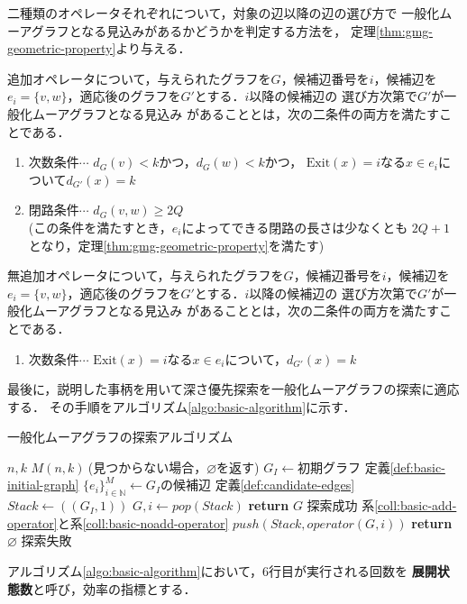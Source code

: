 二種類のオペレータそれぞれについて，対象の辺以降の辺の選び方で
一般化ムーアグラフとなる見込みがあるかどうかを判定する方法を，
定理\ref{thm:gmg-geometric-property}より与える．
\begin{corollary-without-proof}\rm
  \label{coll:basic-add-operator}
  追加オペレータについて，与えられたグラフを$G$，候補辺番号を$i$，候補辺を
  $e_i=\{v,w\}$，適応後のグラフを$G'$とする．$i$以降の候補辺の
  選び方次第で$G'$が一般化ムーアグラフとなる見込み
  があることとは，次の二条件の両方を満たすことである．
  \begin{enumerate}
  \item 次数条件$\cdots$ $d_G(v)<k$かつ，$d_G(w)<k$かつ，
    $\text{Exit}(x)=i$なる$x\in e_i$について$d_{G'}(x)=k$
  \item 閉路条件$\cdots$ $d_G(v,w)\geq2Q$\\
    (この条件を満たすとき，$e_i$によってできる閉路の長さは少なくとも
    $2Q+1$となり，定理\ref{thm:gmg-geometric-property}を満たす)
  \end{enumerate}
\end{corollary-without-proof}
\begin{corollary-without-proof}\rm
  \label{coll:basic-noadd-operator}
  無追加オペレータについて，与えられたグラフを$G$，候補辺番号を$i$，候補辺を
  $e_i=\{v,w\}$，適応後のグラフを$G'$とする．$i$以降の候補辺の
  選び方次第で$G'$が一般化ムーアグラフとなる見込み
  があることとは，次の二条件の両方を満たすことである．
  \begin{enumerate}
  \item 次数条件$\cdots$ $\text{Exit}(x)=i$なる$x\in e_i$について，$d_{G'}(x)=k$
  \end{enumerate}
\end{corollary-without-proof}

最後に，説明した事柄を用いて深さ優先探索を一般化ムーアグラフの探索に適応する．
その手順をアルゴリズム\ref{algo:basic-algorithm}に示す．
\begin{algorithm}[H]
  \caption{一般化ムーアグラフの探索アルゴリズム}
  \label{algo:basic-algorithm}
  \begin{algorithmic}[1]
    \Require $n,k$
    \Ensure $M(n,k)\:$(見つからない場合，$\varnothing$を返す)
    \State $G_I\gets\text{初期グラフ}$
    \Comment 定義\ref{def:basic-initial-graph}
    \State $\{e_i\}_{i\in\mathbb{N}}^M\gets G_I\text{の候補辺}$
    \Comment 定義\ref{def:candidate-edges}
    \State $Stack\gets((G_I,1))$
    \State $G,i\gets pop(Stack)$
    \State \textbf{return} $G$
    \Comment 探索成功
    \EndIf
    \Comment 系\ref{coll:basic-add-operator}と系\ref{coll:basic-noadd-operator}
    \State $push(Stack,operator(G,i))$
    \EndIf
    \EndFor
    \EndWhile
    \State \textbf{return} $\varnothing$
    \Comment 探索失敗
    \EndProcedure
  \end{algorithmic}
\end{algorithm}
アルゴリズム\ref{algo:basic-algorithm}において，6行目が実行される回数を
\textbf{展開状態数}と呼び，効率の指標とする．


